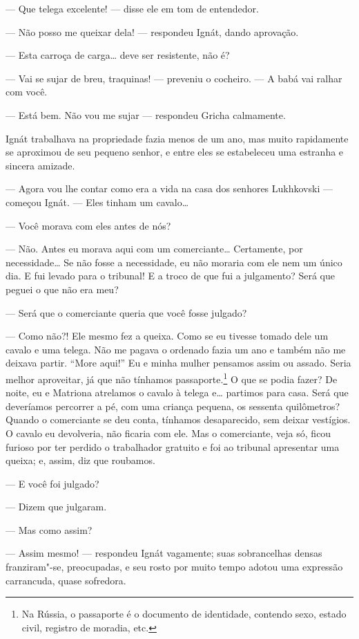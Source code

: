 --- Que telega excelente! --- disse ele em tom de entendedor.

--- Não posso me queixar dela! --- respondeu Ignát, dando aprovação.

--- Esta carroça de carga\ldots{} deve ser resistente, não é?

--- Vai se sujar de breu, traquinas! --- preveniu o cocheiro. --- A babá
vai ralhar com você.

--- Está bem. Não vou me sujar --- respondeu Gricha calmamente.

Ignát trabalhava na propriedade fazia menos de um ano, mas muito
rapidamente se aproximou de seu pequeno senhor, e entre eles se
estabeleceu uma estranha e sincera amizade.

--- Agora vou lhe contar como era a vida na casa dos senhores
Lukhkovski --- começou Ignát. --- Eles tinham um cavalo\ldots{}

--- Você morava com eles antes de nós?

--- Não. Antes eu morava aqui com um comerciante\ldots{} Certamente, por
necessidade\ldots{} Se não fosse a necessidade, eu não moraria com ele nem um
único dia. E fui levado para o tribunal! E a troco de que fui a
julgamento? Será que peguei o que não era meu?

--- Será que o comerciante queria que você fosse julgado?

--- Como não?! Ele mesmo fez a queixa. Como se eu tivesse tomado dele um
cavalo e uma telega. Não me pagava o ordenado fazia um ano e também não
me deixava partir. ``More aqui!'' Eu e minha mulher pensamos assim ou
assado. Seria melhor aproveitar, já que não tínhamos
passaporte.\footnote{Na Rússia, o passaporte é o documento de
  identidade, contendo sexo, estado civil, registro de moradia, etc.} O que se podia fazer? De noite, eu e Matriona atrelamos o
cavalo à telega e\ldots{} partimos para casa. Será que deveríamos percorrer a
pé, com uma criança pequena, os sessenta quilômetros? Quando o
comerciante se deu conta, tínhamos desaparecido, sem deixar vestígios. O
cavalo eu devolveria, não ficaria com ele. Mas o comerciante, veja só,
ficou furioso por ter perdido o trabalhador gratuito e foi ao tribunal
apresentar uma queixa; e, assim, diz que roubamos.

--- E você foi julgado?

--- Dizem que julgaram.

--- Mas como assim?

--- Assim mesmo! --- respondeu Ignát vagamente; suas sobrancelhas densas
franziram"-se, preocupadas, e seu rosto por muito tempo adotou uma
expressão carrancuda, quase sofredora.

